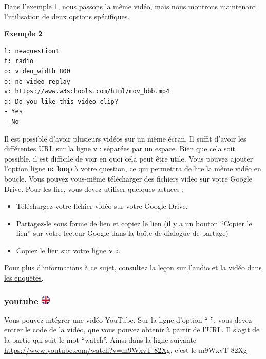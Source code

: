 \documentclass[
]{book}
\providecommand{\tightlist}{%
  \setlength{\itemsep}{0pt}\setlength{\parskip}{0pt}}
\begin{document}
Dans l'exemple 1, nous passons la même vidéo, mais nous montrons maintenant l'utilisation de deux options spécifiques.

\textbf{Exemple 2}

\begin{verbatim}
l: newquestion1
t: radio
o: video_width 800
o: no_video_replay
v: https://www.w3schools.com/html/mov_bbb.mp4
q: Do you like this video clip?
- Yes
- No
\end{verbatim}

Il est possible d'avoir plusieurs vidéos sur un même écran. Il suffit d'avoir les différentes URL sur la ligne v : séparées par un espace. Bien que cela soit possible, il est difficile de voir en quoi cela peut être utile.
Vous pouvez ajouter l'option ligne \textbf{o: loop} à votre question, ce qui permettra de lire la même vidéo en boucle.
Vous pouvez vous-même télécharger des fichiers vidéo sur votre Google Drive. Pour les lire, vous devez utiliser quelques astuces :

\begin{itemize}
\tightlist
\item
  Téléchargez votre fichier vidéo sur votre Google Drive.
\item
  Partagez-le sous forme de lien et copiez le lien (il y a un bouton ``Copier le lien'' sur votre lecteur Google dans la boîte de dialogue de partage)
\item
  Copiez le lien sur votre ligne \textbf{v :}.
\end{itemize}

Pour plus d'informations à ce sujet, consultez la leçon sur \protect\hyperlink{s10}{l'audio et la vidéo dans les enquêtes}.

\hypertarget{youtube}{%
\subsubsection[youtube ]{\texorpdfstring{youtube \href{https://www.psytoolkit.org/doc3.1.0/online-survey-syntax.html\#youtube}{\protect\includegraphics{img/ukflag.png}}}{youtube }}\label{youtube}}

Vous pouvez intégrer une vidéo YouTube. Sur la ligne d'option ``-'', vous devez entrer le code de la vidéo, que vous pouvez obtenir à partir de l'URL. Il s'agit de la partie qui suit le mot ``watch''. Ainsi dans la ligne suivante \url{https://www.youtube.com/watch?v=m9WxvT-82Xg}, c'est le m9WxvT-82Xg
\end{document}
